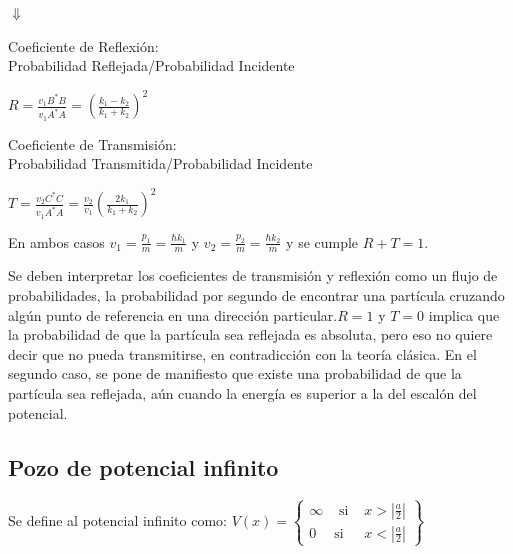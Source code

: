 \documentclass[oneside]{book}
\numberwithin{equation}{section}
\numberwithin{figure}{section}
\numberwithin{table}{section}
\begin{document}
\begin{minipage}[t]{0.5\textwidth}
					\begin{center}
						$\Downarrow$
					\end{center}
					\begin{center}
						Coeficiente de Reflexión:\\
						Probabilidad Reflejada/Probabilidad Incidente
					\end{center}
					\begin{center}
						$\displaystyle R=\frac{v_1B^*B}{v_1A^*A}=\left(\frac{k_1-k_2}{k_1+k_2}\right)^2$
					\end{center}
					\begin{center}
						Coeficiente de Transmisión:\\
						Probabilidad Transmitida/Probabilidad Incidente
					\end{center}
					\begin{center}
						$\displaystyle T=\frac{v_2C^*C}{v_1A^*A}=\frac{v_2}{v_1}\left(\frac{2k_1}{k_1+k_2}\right)^2$
					\end{center}
				\end{minipage}
				
				\vspace{1cm}
				
				\begin{center}
				En ambos casos $\displaystyle v_1=\frac{p_1}{m}=\frac{\hbar k_1}{m}$ y $\displaystyle v_2=\frac{p_2}{m}=\frac{\hbar k_2}{m}$ y se cumple $R+T=1$. 
				\end{center}
						
				Se deben interpretar los coeficientes de transmisión y reflexión como un flujo de probabilidades, la probabilidad por segundo de encontrar una partícula cruzando algún punto de referencia en una dirección particular.$R=1$ y $T=0$ implica que la probabilidad de que la partícula sea reflejada es absoluta, pero eso no quiere decir que no pueda transmitirse, en contradicción con la teoría clásica. En el segundo caso, se pone de manifiesto que existe una probabilidad de que la partícula sea reflejada, aún cuando la energía es superior a la del escalón del potencial.
					
				\subsection{Pozo de potencial infinito}
				
				Se define al potencial infinito como: $\displaystyle V(x)=\begin{Bmatrix} \infty & \mbox{ si }& x>|\frac{a}{2}| \\ 0 & \mbox{si}& x<|\frac{a}{2}|\end{Bmatrix}$\\
				
\end{document}
